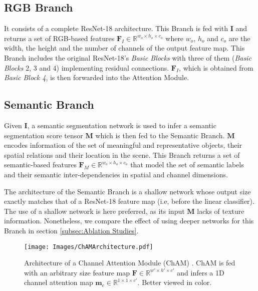 \documentclass[review, 3p, sort&compress]{elsarticle}
\begin{document}
\subsection{RGB Branch}
It consists of a complete ResNet-18 architecture. This Branch is fed with \(\textbf{I}\) and returns a set of RGB-based features \(\textbf{F}_I \in \mathbb{R}^{w_o \times h_o \times c_o}\) where \(w_o\), \(h_o\) and \(c_o\) are the width, the height and the number of channels of the output feature map. This Branch includes the original ResNet-18's \textit{Basic Blocks} with three of them (\textit{Basic Blocks} 2, 3 and 4) implementing residual connections. \(\textbf{F}_I\), which is obtained from \textit{Basic Block 4}, is then forwarded into the Attention Module.

\subsection{Semantic Branch}
Given \(\textbf{I}\), a semantic segmentation network is used to infer a semantic segmentation score tensor \(\textbf{M}\) which is then fed to the Semantic Branch. \(\textbf{M}\) encodes information of the set of meaningful and representative objects, their spatial relations and their location in the scene. This Branch returns a set of semantic-based features \(\textbf{F}_M \in \mathbb{R}^{w_o \times h_o \times c_o}\) that model the set of semantic labels and their semantic inter-dependencies in spatial and channel dimensions. 

The architecture of the Semantic Branch is a shallow network whose output size exactly matches that of a ResNet-18 feature map (i.e, before the linear classifier). The use of a shallow network is here preferred, as its input \(\textbf{M}\) lacks of texture information. Nonetheless, we compare the effect of using deeper networks for this Branch in section \ref{subsec:Ablation Studies}. 

\begin{figure}[t!]
    \centering
    \texttt{[image: Images/ChAMArchitecture.pdf]}
    \caption{Architecture of a Channel Attention Module (ChAM) \cite{woo2018cbam}. ChAM is fed with an arbitrary size feature map \(\textbf{F} \in \mathbb{R}^{w' \times h' \times c'}\) and infers a 1D channel attention map \(\textbf{m}_c \in \mathbb{R}^{1 \times 1 \times c'}\). Better viewed in color.}
    \label{fig:Channel Attention Module Architecture}
\end{figure}
\end{document}
